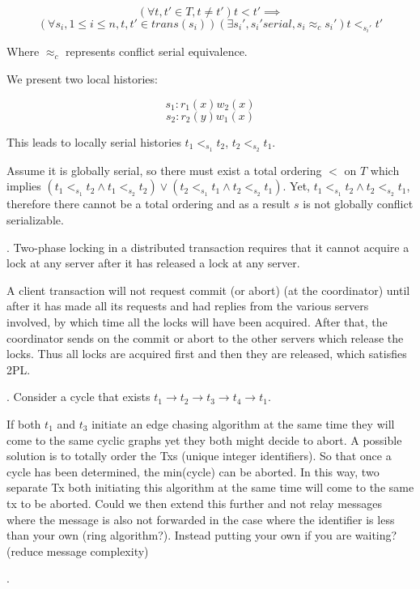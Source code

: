 \documentclass[12pt]{article}
\newcounter{question}
\newcommand{\question}[1]{
    \stepcounter{question}
    \thequestion. #1 \hfill
}
\begin{document}
\[(\forall t, t' \in T, t \not = t') t < t' \implies \]
\[(\forall s_i, 1 \leq i \leq n, t, t' \in trans(s_i))(\exists s_i', s_i' serial, s_i \approx_c s_i') t <_{s_i'} t'\]

Where $\approx_c$ represents conflict serial equivalence.

We present two local histories:

\[s_1: r_1(x) w_2(x)\]
\[s_2: r_2(y) w_1(x)\]


This leads to locally serial histories $t_1 <_{s_1} t_2$, $t_2 <_{s_2} t_1$. 

Assume it is globally serial, so there must exist a total ordering $<$ on $T$ which implies $(t_1 <_{s_1} t_2 \land t_1 <_{s_2} t_2) \lor (t_2 <_{s_1} t_1 \land t_2 <_{s_2} t_1)$. Yet, $t_1 <_{s_1} t_2 \land t_2 <_{s_2} t_1$, therefore there cannot be a total ordering and as a result $s$ is not globally conflict serializable.

\pagebreak
\question{Two-phase locking in a distributed transaction requires that it cannot acquire a lock at any server after it has released a lock at any server.

A client transaction will not request commit (or abort) (at the coordinator) until after it has made all its requests and had replies from the various servers involved, by which time all the locks will have been acquired. After that, the coordinator sends on the commit or abort to the other servers which release the locks. Thus all locks are acquired first and then they are released, which satisfies 2PL.}


\question{Consider a cycle that exists $t_1 \rightarrow t_2 \rightarrow t_3 \rightarrow t_4 \rightarrow t_1$.}

If both $t_1$ and $t_3$ initiate an edge chasing algorithm at the same time they will come to the same cyclic graphs yet they both might decide to abort.  A possible solution is to totally order the Txs (unique integer identifiers). So that once a cycle has been determined, the min(cycle) can be aborted. In this way, two separate Tx both initiating this algorithm at the same time will come to the same tx to be aborted.  Could we then extend this further and not relay messages where the message is also not forwarded in the case where the identifier is less than your own (ring algorithm?). Instead putting your own if you are waiting? (reduce message complexity)

\question{}
\end{document}
